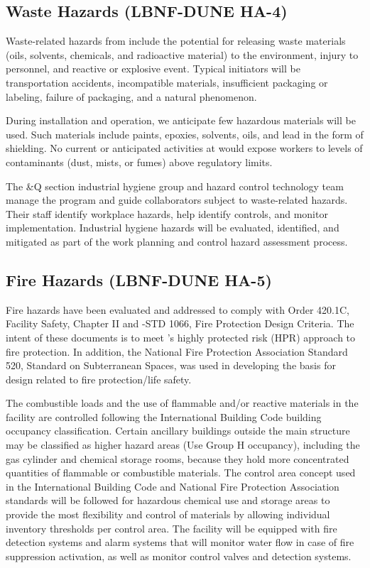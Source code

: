 \subsection{Waste Hazards (LBNF-DUNE HA-4)}

Waste-related hazards from  include the potential for
releasing waste materials (oils, solvents, chemicals, and radioactive
material) to the environment, injury to personnel, and reactive or
explosive event. Typical initiators will be transportation accidents,
incompatible materials, insufficient packaging or labeling, failure of
packaging, and a natural phenomenon.

During installation and  operation, we anticipate few
hazardous materials will be used. Such materials include paints,
epoxies, solvents, oils, and lead in the form of shielding. No current
or anticipated activities at  would expose workers to
levels of contaminants (dust, mists, or fumes) above regulatory
limits.

The \&Q section industrial hygiene group and hazard control
technology team manage the program and guide collaborators subject to
waste-related hazards.  Their staff identify workplace hazards, help
identify controls, and monitor implementation. Industrial hygiene
hazards will be evaluated, identified, and mitigated as part of the
work planning and control hazard assessment process.

\subsection{Fire Hazards (LBNF-DUNE HA-5)}

Fire hazards have been evaluated and addressed to comply with
 Order 420.1C, Facility Safety, Chapter II and
-STD 1066, Fire Protection Design Criteria.  The intent of
these documents is to meet 's highly protected risk (HPR)
approach to fire protection.  In addition, the National Fire
Protection Association Standard 520, Standard on Subterranean Spaces,
was used in developing the basis for design related to fire
protection/life safety.

The combustible loads and the use of flammable and/or reactive
materials in the  facility are controlled
following the International Building Code building occupancy
classification. Certain ancillary buildings outside the main structure
may be classified as higher hazard areas (Use Group H occupancy),
including the gas cylinder and chemical storage rooms, because they
hold more concentrated quantities of flammable or combustible
materials.  The control area concept used in the International
Building Code and National Fire Protection Association standards will
be followed for hazardous chemical use and storage areas to provide
the most flexibility and control of materials by allowing individual inventory
thresholds per control area.  The  facility
will be equipped with fire detection systems and alarm systems that
will monitor water flow in case of fire suppression activation, as well
as monitor control valves and detection systems.

